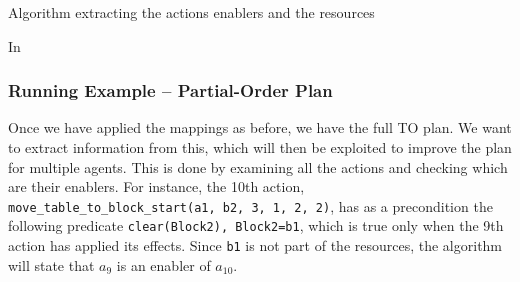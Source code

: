 \begin{algorithm}[htp]
\footnotesize
\caption{Algorithm extracting the actions enablers and the resources}
\label{alg:poplanning}

\DontPrintSemicolon


 {In}




\end{algorithm}

\subsubsection{Running Example -- Partial-Order Plan}
\label{sssec:PORunEx}

Once we have applied the mappings as before, we have the full TO plan. We want to extract information from this, which will then be exploited to improve the plan for multiple agents. This is done by examining all the actions and checking which are their enablers. For instance, the 10th action, \verb|move_table_to_block_start(a1, b2, 3, 1, 2, 2)|, has as a precondition the following predicate \verb|clear(Block2), Block2=b1|, which is true only when the 9th action has applied its effects. Since \verb|b1| is not part of the resources, the algorithm will state that $a_9$ is an enabler of $a_{10}$. 

